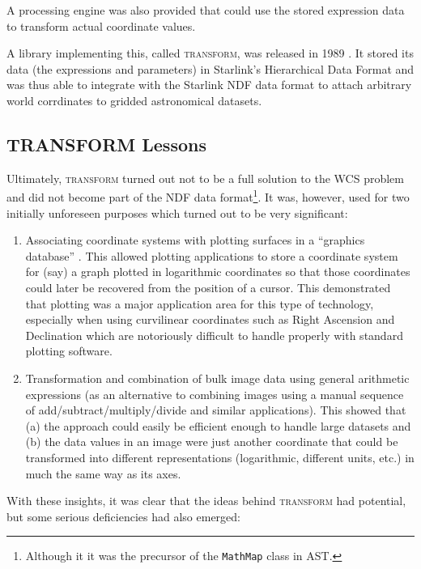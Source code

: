 \documentclass[final,authoryear,5p,times,twocolumn]{elsarticle}
\begin{document}
A processing engine was also provided that could use the stored
expression data to transform actual coordinate values.

A library implementing this, called \textsc{transform}, was released
in 1989 \citep{SUN61,1989StarB...4....7L}. It stored its data (the
expressions and parameters) in Starlink's Hierarchical Data Format
\citep[HDS;][]{SUN92,SSN27} and was thus able to integrate with the
Starlink NDF data format to attach arbitrary world corrdinates to
gridded astronomical datasets.


\subsection{TRANSFORM Lessons}

Ultimately, \textsc{transform} turned out not to be a full solution to
the WCS problem and did not become part of the NDF data
format\footnote{Although it it was the precursor of the
  \texttt{MathMap} class in AST.}. It was, however, used for two
initially unforeseen purposes which turned out to be very significant:

\begin{enumerate}
\item Associating coordinate systems with plotting surfaces in a
  ``graphics database'' \citep[see e.g.,][]{SUN48}. This allowed
  plotting applications to store a coordinate system for (say) a graph
  plotted in logarithmic coordinates so that those coordinates could
  later be recovered from the position of a cursor. This demonstrated
  that plotting was a major application area for this type of
  technology, especially when using curvilinear coordinates such as
  Right Ascension and Declination which are notoriously difficult to
  handle properly with standard plotting software.

\item Transformation and combination of bulk image data using general
  arithmetic expressions (as an alternative to combining images using
  a manual sequence of add/subtract/multiply/divide and similar
  applications). This showed that (a) the approach could easily be
  efficient enough to handle large datasets and (b) the data values in
  an image were just another coordinate that could be transformed into
  different representations (logarithmic, different units, etc.) in
  much the same way as its axes.
\end{enumerate}

With these insights, it was clear that the ideas behind
\textsc{transform} had potential, but some serious deficiencies had
also emerged:
\end{document}
